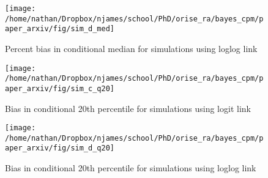 \documentclass[
]{article}
\begin{document}
\begin{figure}

{\centering \texttt{[image: /home/nathan/Dropbox/njames/school/PhD/orise\_ra/bayes\_cpm/paper\_arxiv/fig/sim\_d\_med]} 

}

\caption{Percent bias in conditional median for simulations using loglog link}\label{fig:simplt-med-3}
\end{figure}

\begin{figure}

{\centering \texttt{[image: /home/nathan/Dropbox/njames/school/PhD/orise\_ra/bayes\_cpm/paper\_arxiv/fig/sim\_c\_q20]} 

}

\caption{Bias in conditional 20th percentile for simulations using logit link}\label{fig:simplt-q20-b}
\end{figure}

\begin{figure}

{\centering \texttt{[image: /home/nathan/Dropbox/njames/school/PhD/orise\_ra/bayes\_cpm/paper\_arxiv/fig/sim\_d\_q20]} 

}

\caption{Bias in conditional 20th percentile for simulations using loglog link}\label{fig:simplt-q20-c}
\end{figure}
\end{document}
